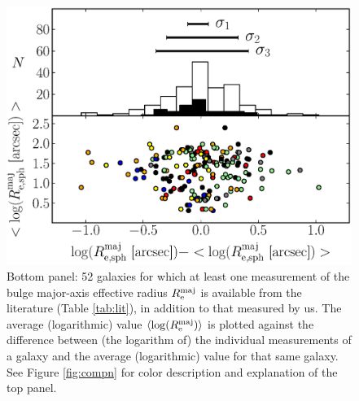 \documentclass[preprint2]{emulateapj}
\begin{document}
\begin{figure}%
\begin{center}
\includegraphics[width=1.1\columnwidth]{images/comparison_all_r_e.eps} 
\caption{Bottom panel: 52 galaxies for which at least one measurement of the bulge major-axis effective radius $R_{\rm e}^{\rm maj}$ is available 
from the literature (Table \ref{tab:lit}), in addition to that measured by us.
The average (logarithmic) value $\langle \log(R_{\rm e}^{\rm maj}) \rangle$ is plotted against 
the difference between (the logarithm of) the individual measurements of a galaxy 
and the average (logarithmic) value for that same galaxy.
See Figure \ref{fig:compn} for color description and explanation of the top panel.}
\label{fig:compre}
\end{center}
\end{figure}
\end{document}
